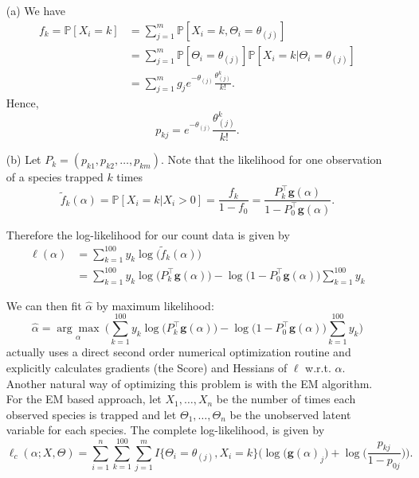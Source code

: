 \begin{itemize}
\item[(a)] We have
	\begin{equation}
	\begin{split}
	f_k = \mathbb P[X_i = k] &= \sum_{j = 1}^m \mathbb P[X_i = k, \Theta_i = \theta_{(j)}] \\
	&= \sum_{j = 1}^m \mathbb P[\Theta_i = \theta_{(j)}]\mathbb P[X_i = k|\Theta_i = \theta_{(j)}] \\
	&= \sum_{j = 1}^m g_j e^{-\theta_{(j)}}\frac{\theta_{(j)}^k}{k!}.
	\end{split}
	\end{equation}
	Hence, 
	\begin{equation}
	p_{kj} =  e^{-\theta_{(j)}}\frac{\theta_{(j)}^k}{k!}.
	\end{equation}

\item[(b)] Let $P_k = (p_{k1} , p_{k2} , \dots, p_{km})$. Note that the likelihood for one observation of a species trapped $k$ times
	\begin{equation*}
	\tilde{f}_k(\alpha) = \mathbb P[X_i = k|X_i > 0] = \frac{f_k}{1 - f_0} = \frac{P_k^\top  \mathbf{g}(\alpha)}{1 - P_0^\top  \mathbf{g}(\alpha)}.
	\end{equation*}
	
	Therefore the log-likelihood for our count data is given by
	\begin{align*}
	\ell(\alpha) &= \sum_{k=1}^{100} y_k \log \big(  \tilde{f}_k(\alpha) \big)\\
	&=  \sum_{k=1}^{100} y_k  \log \big( P_k^\top  \mathbf{g}(\alpha) \big) -  \log \big( 1-P_0^\top  \mathbf{g}(\alpha) \big)  \sum_{k=1}^{100} y_k
	\end{align*}
	
	We can then fit $\hat \alpha$ by maximum likelihood:
	\begin{equation*}
	\hat \alpha = \underset{\alpha}{\arg \max} \ \Bigg( \sum_{k=1}^{100} y_k  \log \big( P_k^\top  \mathbf{g}(\alpha) \big) - \log \big( 1-P_0^\top  \mathbf{g}(\alpha) \big)  \sum_{k=1}^{100} y_k \Bigg)
	\end{equation*}
	 \citet{efron2016empirical} actually uses a direct second order numerical optimization routine and explicitly calculates gradients (the Score) and Hessians of $\ell$ w.r.t. $\alpha$. Another natural way of optimizing this problem is with the EM algorithm. For the EM based approach, let $X_1,\dots,X_n$ be the number of times each observed species is trapped and let $\Theta_1,\dots,\Theta_n$ be the unobserved latent variable for each species. The complete log-likelihood, is given by $$\ell_c( \alpha; X , \Theta ) = \sum_{i=1}^n \sum_{k=1}^{100} \sum_{j=1}^m I \{ \Theta_i = \theta_{(j)}, X_i=k \} \Big( \log \big( \mathbf{g} (\alpha)_j \big) + \log \big( \frac{p_{kj}}{1-p_{0j}}\big) \Big).$$
	

\end{itemize}
